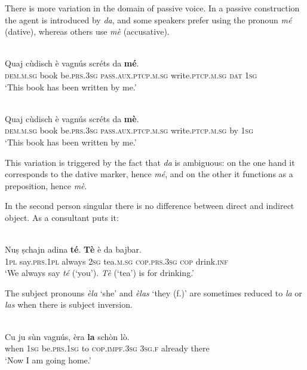There is more variation in the domain of passive voice. In a passive construction the agent is introduced by \textit{da}, and some speakers prefer using the pronoun \textit{mé} (dative), whereas others use \textit{mè} (accusative).

\ea

\\
\gll Quaj cùdisch è vagnús scréts da \textbf{mé}.\\
\textsc{dem.m.sg} book be.\textsc{prs.3sg} \textsc{pass.aux.ptcp.m.sg} write.\textsc{ptcp.m.sg} \textsc{dat} \textsc{1sg}\\
\glt `This book has been written by me.'
\z

\ea

\\
\gll Quaj cùdisch è vagnús scréts da \textbf{mè}.\\
\textsc{dem.m.sg} book be.\textsc{prs.3sg} \textsc{pass.aux.ptcp.m.sg} write.\textsc{ptcp.m.sg} by \textsc{1sg}\\
\glt `This book has been written by me.'
\z

This variation is triggered by the fact that \textit{da} is ambiguous: on the one hand it corresponds to the dative marker, hence \textit{mé}, and on the other it functions as a preposition, hence \textit{mè}.

In the second person singular there is no difference between direct and indirect object. As a consultant puts it:

\ea

\\
\gll  Nuṣ ṣchajn adina \textbf{té}. \textbf{Tè} è da bajbar.\\
\textsc{1pl} say.\textsc{prs.1pl} always \textsc{2sg} tea.\textsc{m.sg} \textsc{cop.prs.3sg} \textsc{cop} drink.\textsc{inf}\\
\glt `We always say \textit{té} (`you'). \textit{Tè} (`tea') is for drinking.'
\z

The subject pronouns \textit{èla} `she' and \textit{èlas} `they (f.)' are sometimes reduced to \textit{la} or \textit{las} when there is subject inversion.

\ea

\\
\gll Cu ju sùn vagnús, èra \textbf{la} schòn lò.\\
when \textsc{1sg} be.\textsc{prs.1sg} to \textsc{cop.impf.3sg} \textsc{3sg.f} already there\\
\glt `Now I am going home.'
\z

